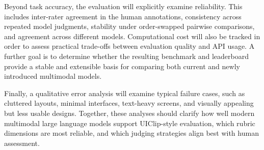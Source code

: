 \documentclass[pdflatex,sn-mathphys-num]{sn-jnl}
\begin{document}
Beyond task accuracy, the evaluation will explicitly examine reliability. This includes
inter-rater agreement in the human annotations, consistency across repeated model
judgments, stability under order-swapped pairwise comparisons, and agreement across
different models. Computational cost will also be tracked in order to assess practical
trade-offs between evaluation quality and API usage. A further goal is to determine
whether the resulting benchmark and leaderboard provide a stable and extensible basis
for comparing both current and newly introduced multimodal models.

Finally, a qualitative error analysis will examine typical failure cases, such as
cluttered layouts, minimal interfaces, text-heavy screens, and visually appealing but
less usable designs. Together, these analyses should clarify how well modern
multimodal large language models support UIClip-style evaluation, which rubric
dimensions are most reliable, and which judging strategies align best with human
assessment.

\backmatter

{\footnotesize\setlength{\bibsep}{0pt}}
\end{document}
